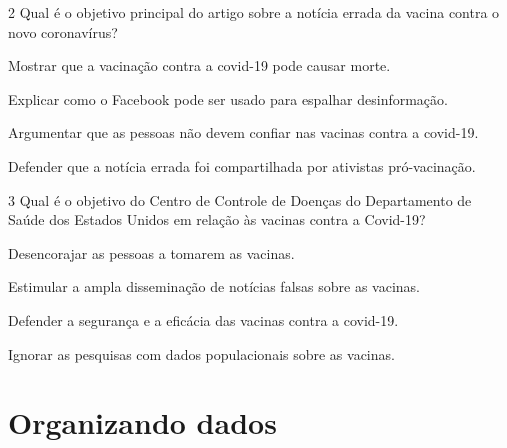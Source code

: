 
\num{2} Qual é o objetivo principal do artigo sobre a notícia errada da vacina
contra o novo coronavírus?

\begin{escolha}
\item Mostrar que a vacinação contra a covid-19 pode causar morte.

\item Explicar como o Facebook pode ser usado para espalhar desinformação.

\item Argumentar que as pessoas não devem confiar nas vacinas contra a covid-19.

\item Defender que a notícia errada foi compartilhada por ativistas pró-vacinação.
\end{escolha}


\num{3} Qual é o objetivo do Centro de Controle de Doenças do Departamento de Saúde dos Estados
Unidos em relação às vacinas contra a Covid-19?

\begin{escolha}
\item Desencorajar as pessoas a tomarem as vacinas.

\item Estimular a ampla disseminação de notícias falsas sobre as vacinas.

\item Defender a segurança e a eficácia das vacinas contra a covid-19.

\item Ignorar as pesquisas com dados populacionais sobre as vacinas.
\end{escolha}


\chapter{Organizando dados}

